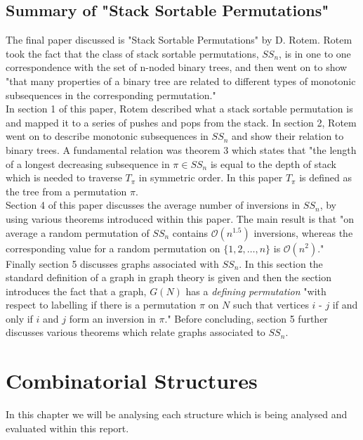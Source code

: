 \documentclass[12pt]{article}
\newcommand{\bigO}{\ensuremath{\mathcal{O}}}
\begin{document}
\subsection{Summary of "Stack Sortable Permutations"}
The final paper discussed is "Stack Sortable Permutations" by D. Rotem. \cite{Rotem1981185} Rotem took the fact that the class of stack sortable permutations, $SS_n$,  is in one to one correspondence with the set of n-noded binary trees, and then went on to show "that many properties of a binary tree are related to different types of monotonic subsequences in the corresponding permutation."\\
In section 1 of this paper, Rotem described what a stack sortable permutation is and mapped it to a series of pushes and pops from the stack. In section 2, Rotem went on to describe monotonic subsequences in $SS_n$ and show their relation to binary trees. A fundamental relation was theorem 3 which states that "the length of a longest decreasing subsequence in $\pi \in SS_n$ is equal to the depth of stack which is needed to traverse $T_{\pi}$ in symmetric order. In this paper $T_{\pi}$ is defined as the tree from a permutation $\pi$.\\
Section 4 of this paper discusses the average number of inversions in $SS_n$, by using various theorems introduced within this paper. The main result is that "on average a random permutation of $SS_n$ contains $\bigO(n^{1.5})$ inversions, whereas the corresponding value for a random permutation on $\{1,2,\dotsc, n\}$ is $\bigO(n^2)$."\\
Finally section 5 discusses graphs associated with $SS_n$. In this section the standard definition of a graph in graph theory is given and then the section introduces the fact that a graph, $G(N)$ has a {\it defining permutation} "with respect to labelling if there is a permutation $\pi$ on $N$ such that vertices $i$ - $j$ if and only if $i$ and $j$ form an inversion in $\pi$." Before concluding, section 5 further discusses various theorems which relate graphs associated to $SS_n$. 
\section{Combinatorial Structures}
In this chapter we will be analysing each structure which is being analysed and evaluated within this report.
\end{document}
